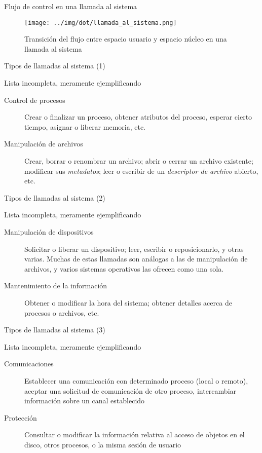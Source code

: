 \documentclass[presentation]{beamer}
\begin{document}
\begin{frame}[label={sec:org6e2c38f}]{Flujo de control en una llamada al sistema}
\begin{figure}[htbp]
\centering
\texttt{[image: ../img/dot/llamada\_al\_sistema.png]}
\caption{Transición del flujo entre espacio usuario y espacio núcleo en una llamada al sistema}
\end{figure}
\end{frame}
\begin{frame}[label={sec:org57e6d6b}]{Tipos de llamadas al sistema (1)}
\begin{center}
Lista incompleta, meramente ejemplificando
\end{center}
\begin{description}
\item[{Control de procesos}] Crear o finalizar un proceso, obtener
atributos del proceso, esperar cierto tiempo, asignar o liberar
memoria, etc.

\item[{Manipulación de archivos}] Crear, borrar o renombrar un archivo;
abrir o cerrar un archivo existente; modificar sus \emph{metadatos};
leer o escribir de un \emph{descriptor de archivo} abierto, etc.
\end{description}
\end{frame}

\begin{frame}[label={sec:orga68e7e7}]{Tipos de llamadas al sistema (2)}
\begin{center}
Lista incompleta, meramente ejemplificando
\end{center}
\begin{description}
\item[{Manipulación de dispositivos}] Solicitar o liberar un dispositivo;
leer, escribir o reposicionarlo, y otras varias. Muchas de estas
llamadas son análogas a las de manipulación de archivos, y varios
sistemas operativos las ofrecen como una sola.
\item[{Mantenimiento de la información}] Obtener o modificar la hora del
sistema; obtener detalles acerca de procesos o archivos, etc.
\end{description}
\end{frame}

\begin{frame}[label={sec:org8e93a05}]{Tipos de llamadas al sistema (3)}
\begin{center}
Lista incompleta, meramente ejemplificando
\end{center}
\begin{description}
\item[{Comunicaciones}] Establecer una comunicación con determinado
proceso (local o remoto), aceptar una solicitud de
comunicación de otro proceso, intercambiar
información sobre un canal establecido

\item[{Protección}] Consultar o modificar la información relativa al
acceso de objetos en el disco, otros procesos, o la
misma sesión de usuario
\end{description}
\end{frame}
\end{document}

